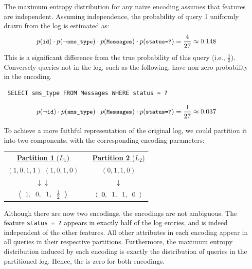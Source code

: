 \begin{example}
\label{naivemixtureencodingexample}
The maximum entropy distribution for any naive encoding assumes that features are independent.
Assuming independence, the probability of query 1 uniformly drawn from the log is estimated as: 
$$
 p(\texttt{\small id})\cdot
 p(\neg \texttt{\small sms\_type})\cdot
 p(\texttt{\small Messages})\cdot
 p(\texttt{\small status=?}) =
  \frac{4}{27} \approx 0.148
$$
This is a significant difference from the true probability of this query (i.e., $\frac{1}{3}$).  
Conversely queries not in the log, such as the following, have non-zero probability in the encoding. 
\begin{lstlisting}
 SELECT sms_type FROM Messages WHERE status = ?
\end{lstlisting}
\vspace*{-3mm}
$$
 p(\neg\texttt{\small id})\cdot
 p(\texttt{\small sms\_type})\cdot
 p(\texttt{\small Messages})\cdot
 p(\texttt{\small status=?}) =
  \frac{1}{27} \approx 0.037
$$
\end{example}

To achieve a more faithful representation of the original log, we could partition it into two components, with the corresponding encoding parameters:
\begin{center}
\begin{tabular}{cp{6mm}c}
\underline{\textbf{Partition 1} ($L_1$)} && \underline{\textbf{Partition 2} ($L_2$)} \\[1.5mm]
$(1, 0, 1, 1)$ \hspace{3mm} $(1, 0, 1, 0)$ &&  $(0, 1, 1, 0)$\\
$\downarrow$\hspace{8mm}$\downarrow$ && $\downarrow$\\
$\left<\;{\hspace{1mm}1, \hspace{2mm} 0, \hspace{2mm} 1, \hspace{2mm} \frac{1}{2}\hspace{1mm}}\;\right>$ && 
$\left<\;{\hspace{1mm}0, \hspace{2mm} 1, \hspace{2mm} 1, \hspace{2mm} 0\hspace{1mm}}\;\right>$
\end{tabular}
\end{center}

Although there are now two encodings, the encodings are not ambiguous. The feature \lstinline{status = ?} appears in exactly half of the log entries, and is indeed independent of the other features.  
All other attributes in each encoding appear in all queries in their respective partitions.  
Furthermore, the maximum entropy distribution induced by each encoding is exactly the distribution of queries in the partitioned log.  
Hence, the \errorname is zero for both encodings.

